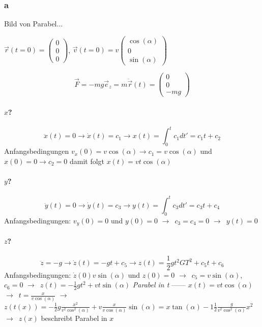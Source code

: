 \documentclass[oneside]{book}
\theoremstyle{definition}
\newcommand{\conseq}{$\rightarrow$~}
\newcommand{\tvector}[1]{\begin{pmatrix}#1\end{pmatrix}}
\newcommand{\ddotvec}[1]{\ddot{\vec{#1}}}
\begin{document}
\subsubsection{a}
Bild von Parabel...

$\vec{r}(t =0) = \begin{pmatrix}0\\0\\0\end{pmatrix}$, $\vec{v}(t = 0)=v \tvector{\cos(\alpha) \\0 \\ \sin(\alpha)}$

$$\vec{F} = - m g \vec{e}_z = m \ddotvec{r} (t) = \begin{pmatrix}0\\ 0\\ - mg \end{pmatrix}$$

\paragraph{$x$?}
$$\ddot{x}(t) = 0 \rightarrow \dot{x}(t) = c_1 \rightarrow x(t) = \int_0^t c_1 dt' = c_1 t + c_2$$
Anfangsbedingungen $v_x(0) = v \cos(\alpha) \rightarrow c_1 = v \cos(\alpha)$ und $x(0) = 0 \rightarrow c_2 = 0$ damit folgt $x(t) = v t \cos(\alpha)$

\paragraph{$y$?}
$$\ddot{y}(t) = 0 \rightarrow \dot{y}(t) = c_3 \rightarrow y(t) = \int_0^t c_3 d t' = c_3 t + c_4$$
Anfangsbedingungen: $v_y(0) = 0$ und $y(0) = 0$ \conseq $c_3 = c_4 = 0$ \conseq $y(t) = 0$

\paragraph{$z$?}
$$\ddot{z} = -g \rightarrow \dot{z}(t) = - gt + c_5 \rightarrow z(t) = \frac{1}{2} g t^2 GT^2 + c_5 t +c_6$$
Anfangsbedingungen: $\dot{z}(0) v \sin(\alpha)$ und $z(0) = 0$ \conseq $c_5 = v \sin(\alpha)$, $c_6 = 0$ \conseq $z(t) = - \frac{1}{2} g t^2 + v t \sin(\alpha)$ \textit{Parabel in t}
------
$x(t) = v t \cos(\alpha)$ \conseq $t = \frac{x}{v \cos(\alpha)}$ \conseq $z(t(x)) = - \frac{1}{2} g \frac{x^2}{v^2 \cos^2(\alpha)} + v \frac{x}{v \cos(\alpha)} \sin(\alpha) = x\tan(\alpha) - 1 \frac{1}{2} \frac{g}{v^2 \cos^2(\alpha)} x^2$ \conseq $z(x)$ beschreibt Parabel in $x$
\end{document}
